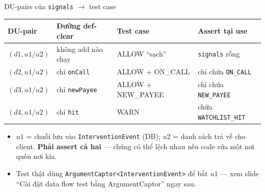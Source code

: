 \documentclass[aspectratio=169,12pt]{beamer}
\begin{document}
\begin{frame}{DU-pairs của \texttt{signals} $\to$ test case}
  \begin{center}
  \footnotesize
  \setlength{\tabcolsep}{3.5pt}
  \begin{tabular}{llll}
    \toprule
    \textbf{DU-pair} & \textbf{Đường def-clear} & \textbf{Test case} & \textbf{Assert tại use} \\
    \midrule
    $(d1, u1/u2)$ & không add nào chạy & ALLOW ``sạch'' & \texttt{signals} rỗng \\
    $(d2, u1/u2)$ & chỉ \texttt{onCall} & ALLOW + ON\_CALL & chỉ chứa \texttt{ON\_CALL} \\
    $(d3, u1/u2)$ & chỉ \texttt{newPayee} & ALLOW + NEW\_PAYEE & chỉ chứa \texttt{NEW\_PAYEE} \\
    $(d4, u1/u2)$ & chỉ \texttt{hit} & WARN & chứa \texttt{WATCHLIST\_HIT} \\
    \bottomrule
  \end{tabular}
  \end{center}

  \vspace{0.3em}
  \begin{itemize}
    \item $u1$ = chuỗi lưu vào \texttt{InterventionEvent} (DB);
          $u2$ = danh sách trả về cho client. \textbf{Phải assert cả hai} ---
          chúng có thể lệch nhau nếu code sửa một nơi quên nơi kia.
    \item Test thật dùng \texttt{ArgumentCaptor<InterventionEvent>}
          để bắt $u1$ --- xem slide ``Cài đặt data flow test bằng
          ArgumentCaptor'' ngay sau.
  \end{itemize}
\end{frame}
\end{document}
